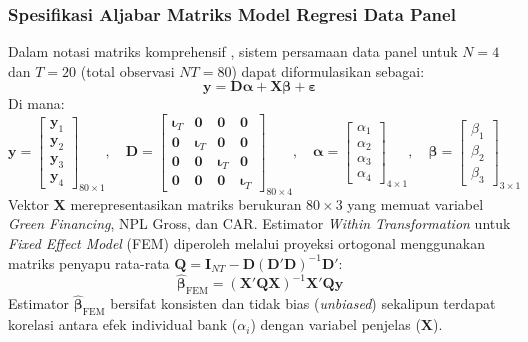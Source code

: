 \documentclass[12pt,a4paper]{article}
\numberwithin{equation}{section}
\begin{document}
\subsubsection{Spesifikasi Aljabar Matriks Model Regresi Data Panel}
\noindent
Dalam notasi matriks komprehensif \citep{Greene2018, Wooldridge2020}, sistem persamaan data panel untuk $N = 4$ dan $T = 20$ (total observasi $NT = 80$) dapat diformulasikan sebagai:
\begin{equation}
  \mathbf{y} = \mathbf{D}\boldsymbol{\alpha} + \mathbf{X}\boldsymbol{\beta} + \boldsymbol{\varepsilon}
\end{equation}
Di mana:
\begin{equation}
  \mathbf{y} = \begin{bmatrix} \mathbf{y}_1 \\ \mathbf{y}_2 \\ \mathbf{y}_3 \\ \mathbf{y}_4 \end{bmatrix}_{80 \times 1}, \quad
  \mathbf{D} = \begin{bmatrix} \boldsymbol{\iota}_T & \mathbf{0} & \mathbf{0} & \mathbf{0} \\ \mathbf{0} & \boldsymbol{\iota}_T & \mathbf{0} & \mathbf{0} \\ \mathbf{0} & \mathbf{0} & \boldsymbol{\iota}_T & \mathbf{0} \\ \mathbf{0} & \mathbf{0} & \mathbf{0} & \boldsymbol{\iota}_T \end{bmatrix}_{80 \times 4}, \quad
  \boldsymbol{\alpha} = \begin{bmatrix} \alpha_1 \\ \alpha_2 \\ \alpha_3 \\ \alpha_4 \end{bmatrix}_{4 \times 1}, \quad
  \boldsymbol{\beta} = \begin{bmatrix} \beta_1 \\ \beta_2 \\ \beta_3 \end{bmatrix}_{3 \times 1}
\end{equation}
Vektor $\mathbf{X}$ merepresentasikan matriks berukuran $80 \times 3$ yang memuat variabel \emph{Green Financing}, NPL Gross, dan CAR. Estimator \emph{Within Transformation} untuk \emph{Fixed Effect Model} (FEM) diperoleh melalui proyeksi ortogonal menggunakan matriks penyapu rata-rata $\mathbf{Q} = \mathbf{I}_{NT} - \mathbf{D}(\mathbf{D}'\mathbf{D})^{-1}\mathbf{D}'$:
\begin{equation}
  \hat{\boldsymbol{\beta}}_{\text{FEM}} = (\mathbf{X}'\mathbf{Q}\mathbf{X})^{-1} \mathbf{X}'\mathbf{Q}\mathbf{y}
\end{equation}
Estimator $\hat{\boldsymbol{\beta}}_{\text{FEM}}$ bersifat konsisten dan tidak bias (\emph{unbiased}) sekalipun terdapat korelasi antara efek individual bank ($\alpha_i$) dengan variabel penjelas ($\mathbf{X}$).
\end{document}
